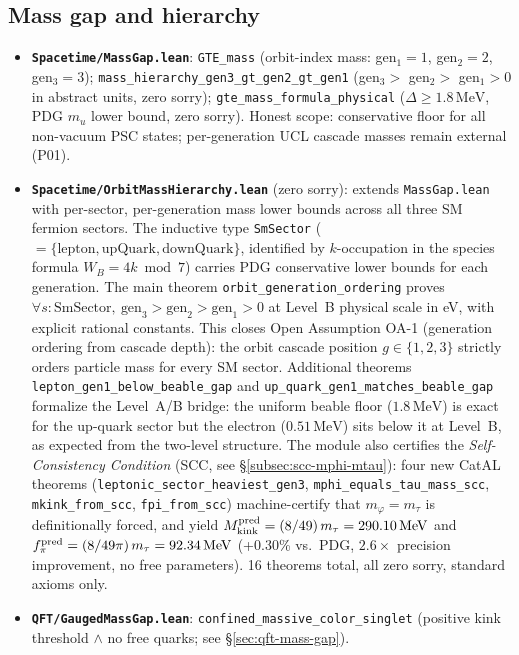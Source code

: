 \documentclass[11pt,a4paper]{article}
\theoremstyle{definition}
\begin{document}
\subsection{Mass gap and hierarchy}\label{subsec:mass-gap-hierarchy}

\begin{itemize}[nosep]
\item \textbf{\texttt{Spacetime/MassGap.lean}}: \lstinline|GTE_mass|
  (orbit-index mass: gen$_1 = 1$, gen$_2 = 2$, gen$_3 = 3$);
  \lstinline|mass_hierarchy_gen3_gt_gen2_gt_gen1|
  (gen$_3 >$ gen$_2 >$ gen$_1 > 0$ in abstract units, zero sorry);
  \lstinline|gte_mass_formula_physical| ($\Delta \geq 1.8\,\mathrm{MeV}$, PDG $m_u$
  lower bound, zero sorry).
  Honest scope: conservative floor for all non-vacuum PSC states; per-generation
  UCL cascade masses remain external (P01).
\item \textbf{\texttt{Spacetime/OrbitMassHierarchy.lean}} (zero sorry):
  extends \texttt{MassGap.lean} with per-sector, per-generation mass lower bounds
  across all three SM fermion sectors.  The inductive type \lstinline|SmSector|
  ($= \{\text{lepton}, \text{upQuark}, \text{downQuark}\}$, identified by $k$-occupation
  in the species formula $W_B = 4k \bmod 7$) carries PDG conservative lower bounds
  for each generation.  The main theorem \lstinline|orbit_generation_ordering|
  proves $\forall s : \text{SmSector},\ \text{gen}_3 > \text{gen}_2 > \text{gen}_1 > 0$
  at Level~B physical scale in eV, with explicit rational constants.
  This closes Open Assumption OA-1 (generation ordering from cascade depth):
  the orbit cascade position $g \in \{1,2,3\}$ strictly orders particle mass for
  every SM sector.  Additional theorems \lstinline|lepton_gen1_below_beable_gap|
  and \lstinline|up_quark_gen1_matches_beable_gap| formalize the Level~A/B bridge:
  the uniform beable floor ($1.8\,\mathrm{MeV}$) is exact for the up-quark sector
  but the electron ($0.51\,\mathrm{MeV}$) sits below it at Level~B, as expected
  from the two-level structure.
  The module also certifies the \emph{Self-Consistency Condition}
  (SCC, see \S\ref{subsec:scc-mphi-mtau}): four new CatAL theorems
  (\lstinline|leptonic_sector_heaviest_gen3|,
   \lstinline|mphi_equals_tau_mass_scc|,
   \lstinline|mkink_from_scc|,
   \lstinline|fpi_from_scc|)
  machine-certify that $m_\varphi = m_\tau$ is definitionally forced,
  and yield $M_{\rm kink}^{\rm pred} = (8/49)\,m_\tau = 290.10\,\mathrm{MeV}$
  and $f_\pi^{\rm pred} = (8/49\pi)\,m_\tau = 92.34\,\mathrm{MeV}$ (+0.30\%
  vs.\ PDG, $2.6\times$ precision improvement, no free parameters).
  16 theorems total, all zero sorry, standard axioms only.
\item \textbf{\texttt{QFT/GaugedMassGap.lean}}: \lstinline|confined_massive_color_singlet|
  (positive kink threshold $\wedge$ no free quarks; see §\ref{sec:qft-mass-gap}).
\end{itemize}
\end{document}
